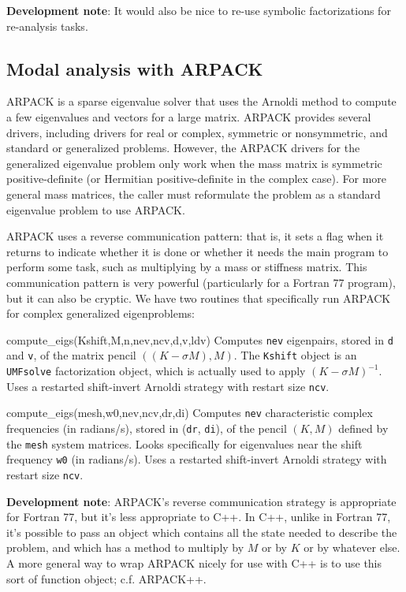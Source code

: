\documentclass{article}
\newcommand{\devnote}[1]{%
  \begin{trivlist}
  \item\textbf{Development note}: #1
  \end{trivlist}}
\newenvironment{codelist}[1][\quad]%
  {\begin{list}{}{%
   \settowidth{\labelwidth}{\texttt{#1}\hfil}%
   \setlength{\leftmargin}{\labelwidth}%
   \addtolength{\leftmargin}{\labelsep}%
   \addtolength{\leftmargin}{\parindent}%
   \renewcommand{\makelabel}[1]{\texttt{##1}}}}%
  {\end{list}}
\newcommand{\ttt}[1]{\texttt{#1}}
\begin{document}
\devnote{It would also be nice to re-use symbolic factorizations for
  re-analysis tasks.}


\subsection{Modal analysis with ARPACK}
\label{section-eigs}

ARPACK is a sparse eigenvalue solver that uses the Arnoldi method to
compute a few eigenvalues and vectors for a large matrix.  ARPACK
provides several drivers, including drivers for real or complex,
symmetric or nonsymmetric, and standard or generalized problems.
However, the ARPACK drivers for the generalized eigenvalue problem
only work when the mass matrix is symmetric positive-definite (or
Hermitian positive-definite in the complex case).  For more general
mass matrices, the caller must reformulate the problem as a standard
eigenvalue problem to use ARPACK.

ARPACK uses a reverse communication pattern: that is, it sets a flag
when it returns to indicate whether it is done or whether it needs the
main program to perform some task, such as multiplying by a mass or
stiffness matrix.  This communication pattern is very powerful
(particularly for a Fortran 77 program), but it can also be cryptic.
We have two routines that specifically run ARPACK for complex
generalized eigenproblems:
\begin{codelist}

  \item[compute\_eigs(Kshift,M,n,nev,ncv,d,v,ldv)]
    Computes \ttt{nev} eigenpairs, stored in \ttt{d} and
    \ttt{v}, of the matrix pencil $((K-\sigma M), M)$.  The
    \ttt{Kshift} object is an \ttt{UMFsolve} factorization
    object, which is actually used to apply $(K-\sigma M)^{-1}$.  Uses
    a restarted shift-invert Arnoldi strategy with restart size
    \ttt{ncv}.

  \item[compute\_eigs(mesh,w0,nev,ncv,dr,di)] 
    Computes \ttt{nev} characteristic complex frequencies (in
    radians/s), stored in (\ttt{dr}, \ttt{di}), of the pencil $(K,M)$
    defined by the \ttt{mesh} system matrices.  Looks specifically for
    eigenvalues near the shift frequency \ttt{w0} (in radians/s).
    Uses a restarted shift-invert Arnoldi strategy with restart size
    \ttt{ncv}.

\end{codelist}

\devnote{ARPACK's reverse communication strategy is appropriate for
  Fortran 77, but it's less appropriate to C++.  In C++, unlike in
  Fortran 77, it's possible to pass an object which contains all the
  state needed to describe the problem, and which has a method to
  multiply by $M$ or by $K$ or by whatever else.  A more general way
  to wrap ARPACK nicely for use with C++ is to use this sort of
  function object; c.f. ARPACK++.
}
\end{document}

